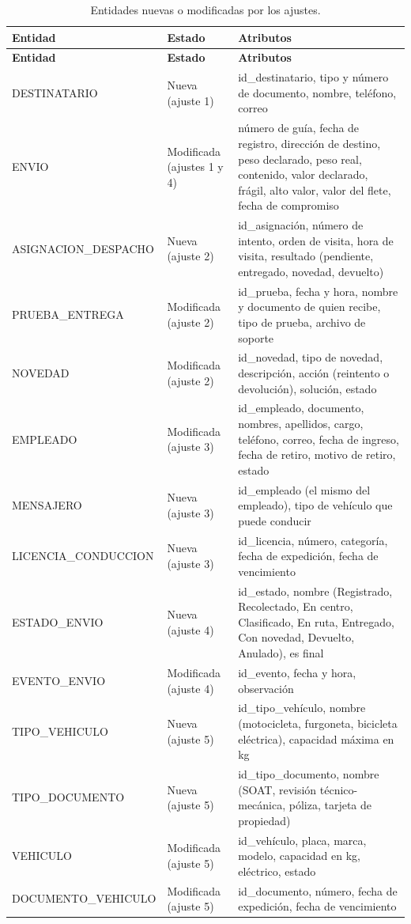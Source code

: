 {\singlespacing\small
\begin{longtable}{L{3.6cm} L{3.4cm} L{7.4cm}}
\caption{Entidades nuevas o modificadas por los ajustes.}
\label{tab:atributosajustados}\\
\toprule
\textbf{Entidad} & \textbf{Estado} & \textbf{Atributos} \\
\midrule
\endfirsthead
\toprule
\textbf{Entidad} & \textbf{Estado} & \textbf{Atributos} \\
\midrule
\endhead
\bottomrule
\endfoot
DESTINATARIO & Nueva (ajuste 1) & id\_destinatario, tipo y número de documento, nombre, teléfono, correo \\
ENVIO & Modificada (ajustes 1 y 4) & número de guía, fecha de registro, dirección de destino, peso declarado, peso real, contenido, valor declarado, frágil, alto valor, valor del flete, fecha de compromiso \\
ASIGNACION\_\allowbreak DESPACHO & Nueva (ajuste 2) & id\_asignación, número de intento, orden de visita, hora de visita, resultado (pendiente, entregado, novedad, devuelto) \\
PRUEBA\_\allowbreak ENTREGA & Modificada (ajuste 2) & id\_prueba, fecha y hora, nombre y documento de quien recibe, tipo de prueba, archivo de soporte \\
NOVEDAD & Modificada (ajuste 2) & id\_novedad, tipo de novedad, descripción, acción (reintento o devolución), solución, estado \\
EMPLEADO & Modificada (ajuste 3) & id\_empleado, documento, nombres, apellidos, cargo, teléfono, correo, fecha de ingreso, fecha de retiro, motivo de retiro, estado \\
MENSAJERO & Nueva (ajuste 3) & id\_empleado (el mismo del empleado), tipo de vehículo que puede conducir \\
LICENCIA\_\allowbreak CONDUCCION & Nueva (ajuste 3) & id\_licencia, número, categoría, fecha de expedición, fecha de vencimiento \\
ESTADO\_ENVIO & Nueva (ajuste 4) & id\_estado, nombre (Registrado, Recolectado, En centro, Clasificado, En ruta, Entregado, Con novedad, Devuelto, Anulado), es final \\
EVENTO\_ENVIO & Modificada (ajuste 4) & id\_evento, fecha y hora, observación \\
TIPO\_VEHICULO & Nueva (ajuste 5) & id\_tipo\_vehículo, nombre (motocicleta, furgoneta, bicicleta eléctrica), capacidad máxima en kg \\
TIPO\_\allowbreak DOCUMENTO & Nueva (ajuste 5) & id\_tipo\_documento, nombre (SOAT, revisión técnico-mecánica, póliza, tarjeta de propiedad) \\
VEHICULO & Modificada (ajuste 5) & id\_vehículo, placa, marca, modelo, capacidad en kg, eléctrico, estado \\
DOCUMENTO\_\allowbreak VEHICULO & Modificada (ajuste 5) & id\_documento, número, fecha de expedición, fecha de vencimiento \\
\end{longtable}
\par}


